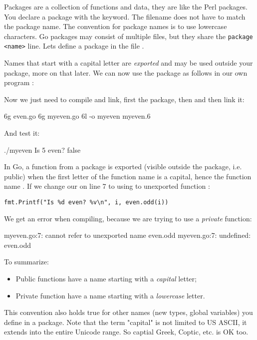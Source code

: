 \noindent{}Packages are a collection of functions and data, they are like the
Perl packages\cite{perl-packages}. You declare a package with the
 keyword. The filename does not
have to match the package name.
The convention for package names is to use
lowercase characters.
Go packages may consist of multiple files,
but they share the \lstinline{package <name>} line.
Lets define a package  in the file .


Names that start with a capital letter are \emph{exported} and may be used
outside your package, more on that later. We can now use
the package as follows in our own program :


\showremarks

Now we just need to compile and link, first the package, then  and
then link it:
\begin{display}
\pr 6g even.go			
\pr 6g myeven.go		
\pr 6l -o myeven myeven.6       
\end{display}
And test it:
\begin{display}
\pr ./myeven
Is 5 even? false
\end{display}

In Go, a function from a package is exported (visible
outside the package, i.e. public) when the first letter of the function name is a capital, hence
the function name . If we change our  on line
7 to using to unexported function :

\noindent\lstinline{fmt.Printf("Is %d even? %v\n", i, even.odd(i))}

We get an error when compiling, because we are trying to use a
\emph{private} function:
\begin{display}
myeven.go:7: cannot refer to unexported name even.odd
myeven.go:7: undefined: even.odd
\end{display}

\noindent{}To summarize:
\begin{itemize}
\item Public functions have a name starting with a \emph{capital}
letter;
\item Private function have a name starting with a \emph{lowercase} letter.
\end{itemize}
This convention also holds true for other names (new types, global
variables) you define in a package. Note that the term "capital" is not limited
to US ASCII, it extends into the entire Unicode range. So captial Greek, Coptic, etc. is OK too.

